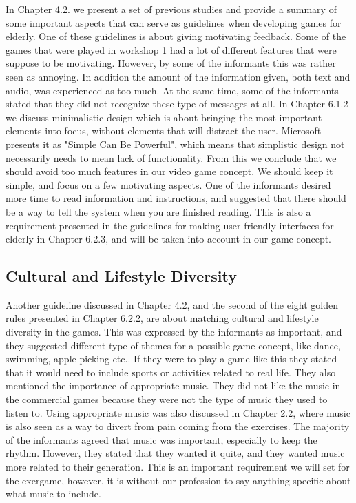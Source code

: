 In Chapter 4.2. we present a set of previous studies and provide a summary of some important aspects that can serve as guidelines when developing games for elderly. One of these guidelines is about giving motivating feedback. Some of the games that were played in workshop 1 had a lot of different features that were suppose to be motivating. However, by some of the informants this was rather seen as annoying.  In addition the amount of the information given, both text and audio, was experienced as too much. At the same time, some of the informants stated that they did not recognize these type of messages at all. In Chapter 6.1.2 we discuss minimalistic design which is about bringing the most important elements into focus, without elements that will distract the user. Microsoft presents it as "Simple Can Be Powerful", which means that simplistic design not necessarily needs to mean lack of functionality. From this we conclude that we should avoid too much features in our video game concept. We should keep it simple, and focus on a few motivating aspects. One of the informants desired more time to read information and instructions, and suggested that there should be a way to tell the system when you are finished reading. This is also a requirement presented in the guidelines for making user-friendly interfaces for elderly in Chapter 6.2.3, and will be taken into account in our game concept. 

\subsection{Cultural and Lifestyle Diversity}
Another guideline discussed in Chapter 4.2, and the second of the eight golden rules presented in Chapter 6.2.2, are about matching cultural and lifestyle diversity in the games. This was expressed by the informants as important, and they suggested different type of themes for a possible game concept, like dance, swimming, apple picking etc.. If they were to play a game like this they stated that it would need to include sports or activities related to real life. They also mentioned the importance of appropriate music. They did not like the music in the commercial games because they were not the type of music they used to listen to. Using appropriate music was also discussed in Chapter 2.2, where music is also seen as a way to divert from pain coming from the exercises. The majority of the informants agreed that music was important, especially to keep the rhythm. However, they stated that they wanted it quite, and they wanted music more related to their generation. This is an important requirement we will set for the exergame, however, it is without our profession to say anything specific about what music to include. 

